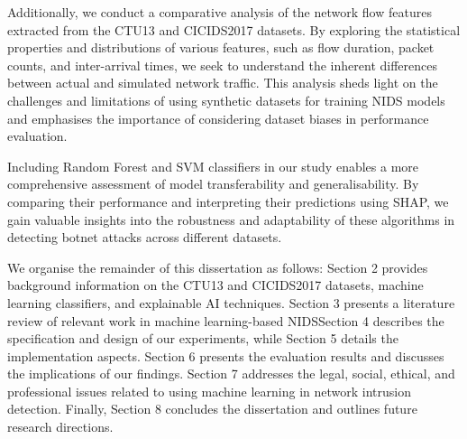 Additionally, we conduct a comparative analysis of the network flow features extracted from the CTU13 and CICIDS2017 datasets. By exploring the statistical properties and distributions of various features, such as flow duration, packet counts, and inter-arrival times, we seek to understand the inherent differences between actual and simulated network traffic. This analysis sheds light on the challenges and limitations of using synthetic datasets for training NIDS models and emphasises the importance of considering dataset biases in performance evaluation.

Including Random Forest and SVM classifiers in our study enables a more comprehensive assessment of model transferability and generalisability. By comparing their performance and interpreting their predictions using SHAP, we gain valuable insights into the robustness and adaptability of these algorithms in detecting botnet attacks across different datasets.

We organise the remainder of this dissertation as follows: Section 2 provides background information on the CTU13 and CICIDS2017 datasets, machine learning classifiers, and explainable AI techniques. Section 3 presents a literature review of relevant work in machine learning-based NIDS\@ Section 4 describes the specification and design of our experiments, while Section 5 details the implementation aspects. Section 6 presents the evaluation results and discusses the implications of our findings. Section 7 addresses the legal, social, ethical, and professional issues related to using machine learning in network intrusion detection. Finally, Section 8 concludes the dissertation and outlines future research directions.